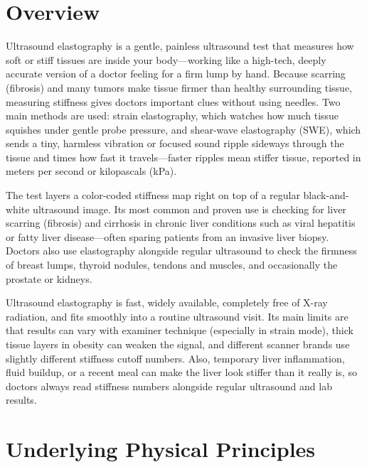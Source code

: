 \label{ch:infographic-ultrasound-elastography}

\section{Overview}

Ultrasound elastography is a gentle, painless ultrasound test that measures how soft or stiff tissues are inside your body---working like a high-tech, deeply accurate version of a doctor feeling for a firm lump by hand. Because scarring (fibrosis) and many tumors make tissue firmer than healthy surrounding tissue, measuring stiffness gives doctors important clues without using needles. Two main methods are used: strain elastography, which watches how much tissue squishes under gentle probe pressure, and shear-wave elastography (SWE), which sends a tiny, harmless vibration or focused sound ripple sideways through the tissue and times how fast it travels---faster ripples mean stiffer tissue, reported in meters per second or kilopascals (kPa).

The test layers a color-coded stiffness map right on top of a regular black-and-white ultrasound image. Its most common and proven use is checking for liver scarring (fibrosis) and cirrhosis in chronic liver conditions such as viral hepatitis or fatty liver disease---often sparing patients from an invasive liver biopsy. Doctors also use elastography alongside regular ultrasound to check the firmness of breast lumps, thyroid nodules, tendons and muscles, and occasionally the prostate or kidneys.

Ultrasound elastography is fast, widely available, completely free of X-ray radiation, and fits smoothly into a routine ultrasound visit. Its main limits are that results can vary with examiner technique (especially in strain mode), thick tissue layers in obesity can weaken the signal, and different scanner brands use slightly different stiffness cutoff numbers. Also, temporary liver inflammation, fluid buildup, or a recent meal can make the liver look stiffer than it really is, so doctors always read stiffness numbers alongside regular ultrasound and lab results.

\section{Underlying Physical Principles}

